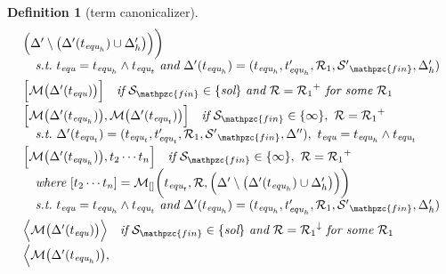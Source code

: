 \documentclass[12pt]{article}
\newtheorem{Definition}{Definition}[section]
\begin{document}
\begin{Definition}[term canonicalizer]
\begin{displaymath}
\begin{array}{l}
\begin{array}{l}
         \Bigl(\Delta' \setminus \bigl(\Delta'(t_{\text{\it equ}_h}) \cup
          \Delta'_h \bigr) \Bigr) \biggr)  \\
      \quad \text{\it s.t.}\ t_{\text{\it equ}} = t_{\text{\it equ}_h}
       \wedge t_{\text{\it equ}_t}\ \text{\it and}\
        \Delta'(t_{\text{\it equ}_h}) = (t_{\text{\it equ}_h},
         t'_{\text{\it equ}_h}, \mathcal{R}_1, {\mathcal{S}'}_{\mathpzc{fin}},
          \Delta'_h)  \\ [5pt]
     \Bigl[\mathcal{M}\bigl(\Delta'(t_{\text{\it equ}}) \bigr) \Bigr]
      \quad \text{\it if}\ \mathcal{S}_{\mathpzc{fin}} \in
       \{\text{\it sol} \}\ \text{\it and}\
        \mathcal{R} = {\mathcal{R}_1}^+\ \text{\it for some}\
         \mathcal{R}_1  \\ [5pt]
     \Bigl[\mathcal{M}\bigl(\Delta'(t_{\text{\it equ}_h}) \bigr),
      \mathcal{M}\bigl(\Delta'(t_{\text{\it equ}_t}) \bigr) \Bigr]
       \quad \text{\it if}\ \mathcal{S}_{\mathpzc{fin}} \in \{\infty\},\
        \mathcal{R} = {\mathcal{R}_1}^+  \\
      \quad \text{\it s.t.}\ \Delta'(t_{\text{\it equ}_t}) =
       (t_{\text{\it equ}_t}, t'_{\text{\it equ}_t}, \mathcal{R}_1,
        {\mathcal{S}'}_{\mathpzc{fin}}, \Delta''),\ t_{\text{\it equ}} =
       t_{\text{\it equ}_h} \wedge t_{\text{\it equ}_t}  \\ [3pt]
     \Bigl[\mathcal{M}\bigl(\Delta'(t_{\text{\it equ}_h}) \bigr),
       t_2 \cdots t_n \Bigr]
      \quad \text{\it if}\ \mathcal{S}_{\mathpzc{fin}} \in \{\infty\},\
       \mathcal{R} = {\mathcal{R}_1}^+  \\
       \quad \text{\it where}\ [t_2 \cdots t_n] =
        \mathcal{M}_{[]}\biggl(t_{\text{\it equ}_t}, \mathcal{R},
         \Bigl(\Delta' \setminus \bigl(\Delta'(t_{\text{\it equ}_h}) \cup
          \Delta'_h \bigr) \Bigr) \biggr)  \\
      \quad \text{\it s.t.}\ t_{\text{\it equ}} = t_{\text{\it equ}_h}
       \wedge t_{\text{\it equ}_t}\ \text{\it and}\
        \Delta'(t_{\text{\it equ}_h}) = (t_{\text{\it equ}_h},
         t'_{\text{\it equ}_h}, \mathcal{R}_1, {\mathcal{S}'}_{\mathpzc{fin}},
          \Delta'_h)  \\ [5pt]
     \Bigl\langle\mathcal{M}\bigl(\Delta'(t_{\text{\it equ}}) \bigr)
      \Bigr\rangle \quad \text{\it if}\ \mathcal{S}_{\mathpzc{fin}} \in
       \{\text{\it sol} \}\ \text{\it and}\
        \mathcal{R} = {\mathcal{R}_1}^\downarrow\ \text{\it for some}\
         \mathcal{R}_1  \\ [5pt]
     \Bigl\langle\mathcal{M}\bigl(\Delta'(t_{\text{\it equ}_h}) \bigr),

\end{array}
\end{array}
\end{displaymath}
\end{Definition}
\end{document}

